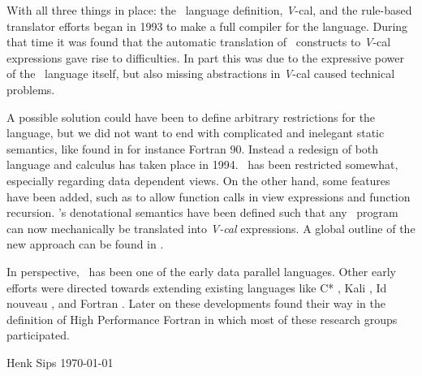 With all three things in place: the \Booster\ language definition,
{\sl V}-cal, and the rule-based translator efforts began in 1993 to
make a full compiler for the language. During that time it was found
that the automatic translation of \Booster\ constructs to {\sl V}-cal
expressions gave rise to difficulties. In part this was due to the
expressive power of the \Booster\ language itself, but also missing
abstractions in {\sl V}-cal caused technical problems. 

A possible solution could have been to define arbitrary restrictions
for the \Booster language, but we did not want to end with complicated
and inelegant static semantics, like found in for instance Fortran 90.
Instead a redesign of both language and calculus has taken place in
1994.  \Booster\ has been restricted somewhat, especially regarding
data dependent views. On the other hand, some features have been
added, such as to allow function calls in view expressions and
function recursion. \Booster's denotational semantics have been defined
such that any \Booster\ program can now mechanically be translated
into {\sl V-cal} expressions.  A global outline of the new approach
can be found in \cite{Trescher94}.

In perspective, \Booster\ has been one of the early data parallel
languages.  Other early efforts were directed towards extending
existing languages like C* \cite{Quinn89}, Kali \cite{Koelbel91}, Id
nouveau \cite{Rogers89}, and Fortran \cite{Gerndt89}
\cite{Callahan88}. Later on these developments found their way in the
definition of High Performance Fortran \cite{HPFF93} in which most of
these research groups participated.

\vspace{2\baselineskip}

\noindent Henk Sips \hfill{\today}
